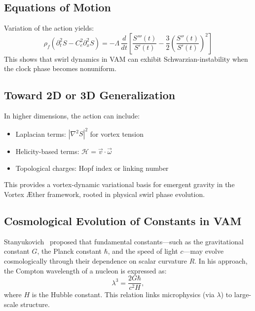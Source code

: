 \documentclass[preprint]{revtex4-2}
\begin{document}
            \subsection{Equations of Motion}
            Variation of the action yields:
            \begin{equation}
            \rho_{\scriptscriptstyle\boldsymbol\!f} (\partial_t^2 S - C_e^2 \partial_x^2 S) = - \Lambda \, \frac{d}{dt} \left[ \frac{S'''(t)}{S'(t)} - \frac{3}{2} \left( \frac{S''(t)}{S'(t)} \right)^2 \right]
            \end{equation}
            This shows that swirl dynamics in VAM can exhibit Schwarzian-instability when the clock phase becomes nonuniform.

            \subsection*{Toward 2D or 3D Generalization}
            In higher dimensions, the action can include:
            \begin{itemize}
            \item Laplacian terms: $|\nabla^2 S|^2$ for vortex tension
            \item Helicity-based terms: $\mathcal{H} = \vec{v} \cdot \vec{\omega}$
            \item Topological charges: Hopf index or linking number
            \end{itemize}

            This provides a vortex-dynamic variational basis for emergent gravity in the Vortex \AE ther framework, rooted in physical swirl phase evolution.

            \subsection{Cosmological Evolution of Constants in VAM}
            Stanyukovich~\cite{stanyukovich2008evolution} proposed that fundamental constants—such as the gravitational constant $G$, the Planck constant $\hbar$, and the speed of light $c$—may evolve cosmologically through their dependence on scalar curvature $R$. In his approach, the Compton wavelength of a nucleon is expressed as:
            \begin{equation}
            \lambda^3 = \frac{2G\hbar}{c^2 H},
            \end{equation}
            where $H$ is the Hubble constant. This relation links microphysics (via $\lambda$) to large-scale structure.
\end{document}
